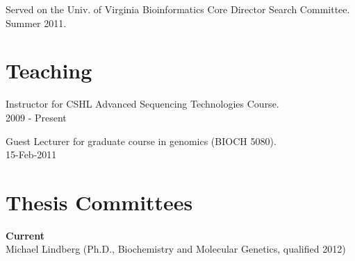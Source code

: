\documentclass[margin,line]{cv}
\begin{document}
\begin{resume}
    \vspace{-2mm}
    Served on the Univ. of Virginia Bioinformatics Core Director Search Committee. \\
    Summer 2011.



    \section{\mysidestyle Teaching}
    Instructor for CSHL Advanced Sequencing Technologies Course.\\
    2009 - Present
    
    \vspace{-2mm}
    Guest Lecturer for graduate course in genomics (BIOCH 5080).\\
    15-Feb-2011
    
    
    
    \section{\mysidestyle Thesis Committees}
    \textbf{Current} \\
    Michael Lindberg (Ph.D., Biochemistry and Molecular Genetics, qualified 2012)
    
    

\end{resume}
\end{document}
